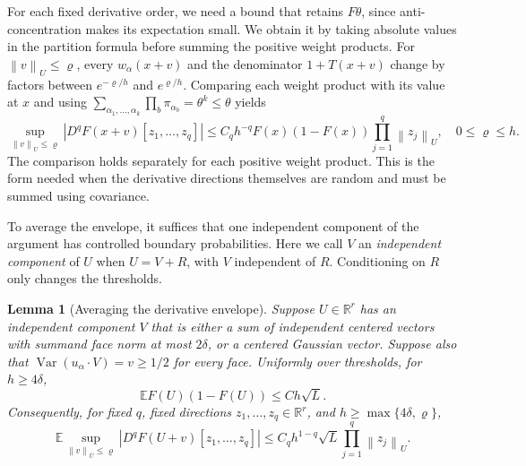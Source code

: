 \documentclass[11pt,letterpaper]{article}
\newtheorem{lemma}{Lemma}
\theoremstyle{remark}
\newcommand{\E}{\mathbb E}
\newcommand{\R}{\mathbb R}
\newcommand{\Var}{\operatorname{Var}}
\newcommand{\norm}[1]{\left\lVert#1\right\rVert}
\begin{document}
For each fixed derivative order, we need a bound that retains
\(F\theta\), since anti-concentration makes its expectation small.
We obtain it by taking absolute values in the partition formula
before summing the positive weight products.
For \(\norm v_U\le\varrho\), every \(w_\alpha(x+v)\) and the
denominator \(1+T(x+v)\) change by factors between
\(e^{-\varrho/h}\) and \(e^{\varrho/h}\). Comparing each weight
product with its value at \(x\) and using
\(\sum_{\alpha_1,\ldots,\alpha_k}\prod_b\pi_{\alpha_b}
=\theta^k\le\theta\) yields
\begin{equation}
 \sup_{\norm v_U\le\varrho}|D^qF(x+v)[z_1,\ldots,z_q]|
 \le C_qh^{-q}F(x)(1-F(x))\prod_{j=1}^q\norm{z_j}_U,
 \quad 0\le\varrho\le h.
 \label{appx-eq:local-envelope}
\end{equation}
The comparison holds separately for each positive weight product.
This is the form needed when the derivative directions themselves
are random and must be summed using covariance.

To average the envelope, it suffices that one independent component
of the argument has controlled boundary probabilities. Here we call
\(V\) an \emph{independent component} of \(U\) when \(U=V+R\), with
\(V\) independent of \(R\). Conditioning on \(R\) only changes the thresholds.
\begin{lemma}[Averaging the derivative envelope]\label{appx-lem:envelope}
Suppose \(U\in\R^r\) has an independent component \(V\) that is
either a sum of independent centered vectors with summand face norm
at most \(2\delta\), or a centered Gaussian vector. Suppose also
that \(\Var(u_\alpha\cdot V)=v\ge1/2\) for every face.
Uniformly over thresholds, for \(h\ge4\delta\),
\begin{equation}
 \E F(U)(1-F(U))\le Ch\sqrt L.
 \label{appx-eq:small-envelope}
\end{equation}
Consequently, for fixed \(q\), fixed directions
\(z_1,\ldots,z_q\in\R^r\), and \(h\ge\max\{4\delta,\varrho\}\),
\begin{equation}
 \E\sup_{\norm v_U\le\varrho}|D^qF(U+v)[z_1,\ldots,z_q]|
 \le C_qh^{1-q}\sqrt L\prod_{j=1}^q\norm{z_j}_U.
 \label{appx-eq:averaged-derivatives}
\end{equation}
\end{lemma}
\end{document}
